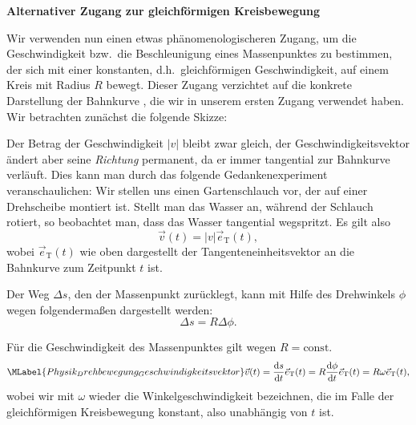              \begin{MExtra} 
             \textbf{Alternativer Zugang zur gleichf\"ormigen Kreisbewegung}
             
             
              Wir verwenden nun einen etwas ph\"anomenologischeren Zugang, um die Geschwindigkeit bzw.~die Beschleunigung eines Massenpunktes zu bestimmen, der sich mit einer konstanten, d.h.~gleichf\"ormigen Geschwindigkeit, auf einem Kreis mit Radius $R$ bewegt. Dieser Zugang verzichtet auf die konkrete Darstellung der Bahnkurve , die wir in unserem ersten Zugang verwendet haben.\\
              
              
               Wir betrachten zun\"achst die folgende Skizze:
             
  
  
  Der Betrag der Geschwindigkeit $\vert v\vert$ bleibt zwar gleich, der Geschwindigkeitsvektor \"andert aber seine \emph{Richtung} permanent, da er immer tangential zur Bahnkurve verl\"auft. Dies kann man durch das folgende Gedankenexperiment veranschaulichen: Wir stellen uns einen Gartenschlauch vor, der auf einer Drehscheibe montiert ist. Stellt man  das Wasser an, w\"ahrend der Schlauch rotiert, so beobachtet man, dass das Wasser tangential wegspritzt. Es gilt also
  \begin{equation}
  \vec{v}(t)=\vert v\vert \vec{e}_{\textrm{T}}(t),
  \end{equation}wobei $\vec{e}_{\textrm{T}}(t)$ wie oben dargestellt der Tangenteneinheitsvektor an die Bahnkurve zum Zeitpunkt $t$ ist. 
  
  Der Weg $\Delta s$, den der Massenpunkt zur\"ucklegt, kann mit Hilfe des Drehwinkels $\phi$ wegen  folgenderma{\ss}en dargestellt werden:
  \begin{equation}
  \Delta s=R\Delta \phi.
  \end{equation} 
  
  \begin{MInfo} F\"ur die Geschwindigkeit des Massenpunktes gilt wegen $R=\textrm{const.}$
  \begin{equation}\MLabel{Physik_Drehbewegung_Geschwindigkeitsvektor}
  \vec{v}(t)=\frac{\textrm{d}s}{\textrm{d}t}\vec{e}_{\textrm{T}}(t)=R\frac{\textrm{d}\phi}{\textrm{d}t}\vec{e}_{\textrm{T}}(t)=R\omega
  \vec{e}_{\textrm{T}}(t),
  \end{equation}wobei wir mit $\omega$ wieder die Winkelgeschwindigkeit bezeichnen, die im Falle der gleichf\"ormigen Kreisbewegung konstant, also unabh\"angig von $t$ ist.
  \end{MInfo}
  

\end{MExtra}
